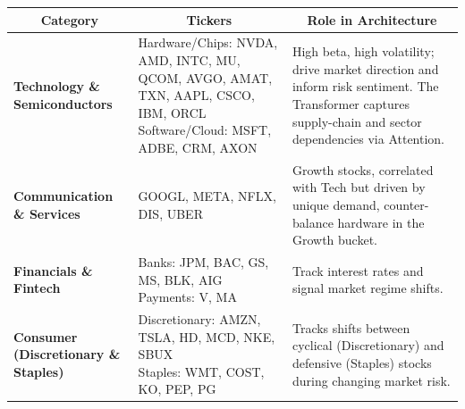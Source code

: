 \documentclass[twoside,final]{hcmut-report}
\begin{document}
\begin{table}[H]
  \centering
  \renewcommand{\arraystretch}{1.25}
  \begin{tabular}{p{3cm}|p{6cm}|p{7cm}}
    \multicolumn{1}{c|}{\textbf{Category}} & \multicolumn{1}{c|}{\textbf{Tickers}} & \multicolumn{1}{c}{\textbf{Role in Architecture}} \\
    \hline

    \textbf{Technology \& Semiconductors}
                                           & \parbox[t]{6cm}{\raggedright
    Hardware/Chips: NVDA, AMD, INTC, MU, QCOM, AVGO, AMAT, TXN, AAPL, CSCO, IBM, ORCL                                                  \\[3pt]
      Software/Cloud: MSFT, ADBE, CRM, AXON
    }
                                           & \parbox[t]{7cm}{\raggedright
      High beta, high volatility; drive market direction and inform risk sentiment. The Transformer captures supply-chain and sector dependencies via Attention.
    }                                                                                                                                  \\
    \hline

    \textbf{Communication \& Services}
                                           & \parbox[t]{6cm}{\raggedright
      GOOGL, META, NFLX, DIS, UBER
    }
                                           & \parbox[t]{7cm}{\raggedright
      Growth stocks, correlated with Tech but driven by unique demand, counter-balance hardware in the Growth bucket.
    }                                                                                                                                  \\
    \hline

    \textbf{Financials \& Fintech}
                                           & \parbox[t]{6cm}{\raggedright
    Banks: JPM, BAC, GS, MS, BLK, AIG                                                                                                  \\[3pt]
      Payments: V, MA
    }
                                           & \parbox[t]{7cm}{\raggedright
      Track interest rates and signal market regime shifts.
    }                                                                                                                                  \\
    \hline

    \textbf{Consumer (Discretionary \& Staples)}
                                           & \parbox[t]{6cm}{\raggedright
    Discretionary: AMZN, TSLA, HD, MCD, NKE, SBUX                                                                                      \\[3pt]
      Staples: WMT, COST, KO, PEP, PG
    }
                                           & \parbox[t]{7cm}{\raggedright
      Tracks shifts between cyclical (Discretionary) and defensive (Staples) stocks during changing market risk.
    }                                                                                                                                  \\
    \hline


\end{tabular}
\end{table}
\end{document}
